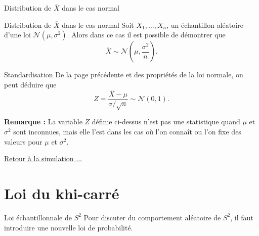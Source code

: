 \documentclass{BeamerTemplate}
\begin{document}
\begin{frame}[t]{Distribution de $\overline{X}$ dans le cas normal}
\begin{Boite}{Distribution de $\overline{X}$ dans le cas normal}
    Soit $X_1,\dots,X_n$, un échantillon aléatoire d'une loi $\mathcal{N}(\mu,\sigma^2)$. Alors dans ce cas
    il est possible de démontrer que
    $$\overline{X}\sim \mathcal{N}\left(\mu,\frac{\sigma^2}{n}\right).$$    
\end{Boite}

\end{frame}

\begin{frame}[t]{Standardisation}
  De la page précédente et des propriétés de la loi normale, on peut déduire que
  $$Z=\frac{\overline{X}-\mu}{\sigma/\sqrt{n}}\sim\mathcal{N}(0,1).$$

  \medskip

  {\bf Remarque :} La variable $Z$ définie ci-dessus n'est pas une statistique quand
  $\mu$ et $\sigma^2$ sont inconnues, mais elle l'est dans les cas où l'on connaît ou l'on
  fixe des valeurs pour $\mu$ et $\sigma^2$.

  \vspace{0.5cm}
\vfill
    \href{https://019fb411-aa6f-c838-1732-d3f86e705246.share.connect.posit.cloud/}{Retour à la simulation ...}
\end{frame}





\section{Loi du khi-carré}

\begin{frame}{Loi échantillonnale de $S^2$}
   Pour discuter du comportement aléatoire de $S^2$, il faut introduire une nouvelle loi de probabilité.
\end{frame}
\end{document}
